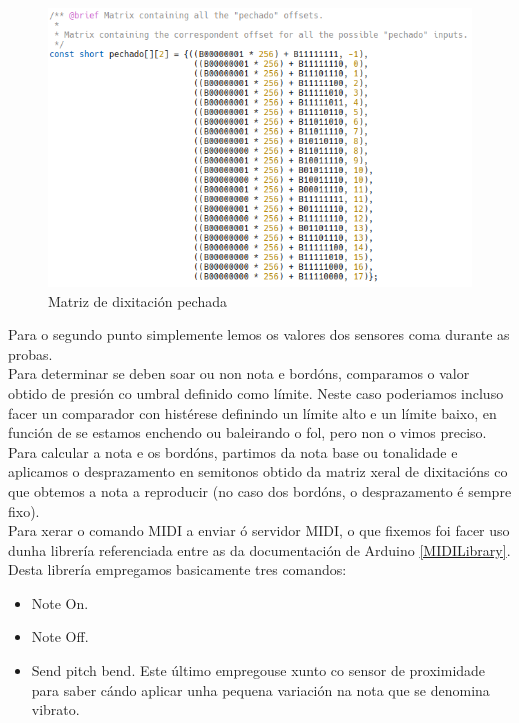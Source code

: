    \begin{figure}[htbp]
    \centering
    \includegraphics[scale=0.6, keepaspectratio=true]{./imagenes/matriz-pechado.png}
    \caption{Matriz de dixitación pechada}
    \label{figura:MatrizPechado}
   \end{figure}
   
   Para o segundo punto simplemente lemos os valores dos sensores coma durante
   as probas. \\
   
   Para determinar se deben soar ou non nota e bordóns, comparamos o valor
   obtido de presión co umbral definido como límite. Neste caso poderiamos
   incluso facer un comparador con histérese definindo un límite alto e un
   límite baixo, en función de se estamos enchendo ou baleirando o fol, pero non
   o vimos preciso. \\
   
   Para calcular a nota e os bordóns, partimos da nota base ou tonalidade e
   aplicamos o desprazamento en semitonos obtido da matriz xeral de dixitacións
   co que obtemos a nota a reproducir (no caso dos bordóns, o desprazamento é
   sempre fixo). \\
   
   Para xerar o comando MIDI a enviar ó servidor MIDI, o que fixemos foi facer
   uso dunha librería referenciada entre as da documentación de Arduino
   \ref{MIDILibrary}. Desta librería empregamos basicamente tres comandos:
   
   \begin{itemize}
    \item Note On.
    \item Note Off.
    \item Send pitch bend. Este último empregouse xunto co sensor de proximidade
        para saber cándo aplicar unha pequena variación na nota que se denomina
        vibrato.
   \end{itemize}
   
